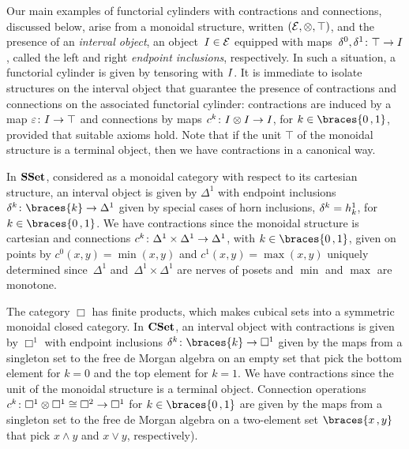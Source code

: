 \documentclass[reqno,10pt,a4paper,oneside,draft]{amsart}
\begin{document}
Our main examples of functorial cylinders with contractions and connections, discussed below, arise from a monoidal structure, written $(\mathcal{E}, \otimes, \top)$, and the presence of an \emph{interval object}, \ie an object~$I \in \mathcal{E}$ equipped with maps~$\delta^0, \delta^1 \colon \top \to I$, called the left and right \emph{endpoint inclusions}, respectively.
In such a situation, a functorial cylinder is given by tensoring with $I$.
It is immediate to isolate structures on the interval object that guarantee the presence of contractions and connections on the associated functorial cylinder: contractions are induced by a map $\varepsilon \colon I \to \top$ and connections by maps $c^k \colon I \otimes I \to I$, for $k \in \braces{0\,, 1}$, provided that suitable axioms hold.
Note that if the unit $\top$ of the monoidal structure is a terminal object, then we have contractions in a canonical way.

\begin{example} \label{exa:cyl-in-sset}
In $\mathbf{SSet}$, considered as a monoidal category with respect to its cartesian structure, an interval object is given by $\Delta^1$ with endpoint inclusions~$\kcyl  \co \braces{k} \to \Delta^1$ given by special cases of horn inclusions, $\delta^k = h^1_k$, for $k \in \braces{0\,, 1}$.
We have contractions since the monoidal structure is cartesian and connections $c^k \colon \Delta^1 \times \Delta^1 \to \Delta^1$, with $k \in \braces{0\,, 1}$, given on points by $c^0(x, y) = \min(x, y)$ and $c^1(x, y) = \max(x, y)$ uniquely determined since~$\Delta^1$ and~$\Delta^1 \times \Delta^1$ are nerves of posets and $\min$ and $\max$ are monotone.
\end{example}

\begin{example} \label{exa:cyl-in-cuset}
The category $\Box$ has finite products, which makes cubical sets into a symmetric monoidal closed category.
In $\mathbf{CSet}$, an interval object with contractions is given by $\Box^1$ with endpoint inclusions $\kcyl \co \braces{k} \to \Box^1$ given by the maps from a singleton set to the free de Morgan algebra on an empty set that pick the bottom element for $k = 0$ and the top element for $k =1$.
We have contractions since the unit of the monoidal structure is a terminal object.
Connection operations $c^k \colon \Box^1 \otimes \Box^1 \cong \Box^2 \to \Box^1$ for $k \in \braces{0\,, 1}$ are given by the maps from a singleton set to the free de Morgan algebra on a two-element set $\braces{x\,, y}$ that pick $x \wedge y$ and $x \vee y$, respectively).
\end{example}
\end{document}
